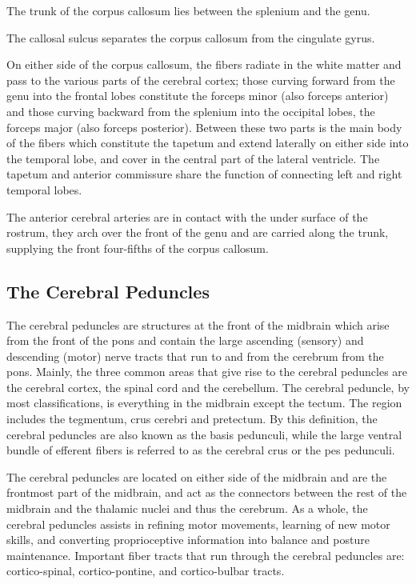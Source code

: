 The trunk of the corpus callosum lies between the splenium and the genu.

The callosal sulcus separates the corpus callosum from the cingulate gyrus.

On either side of the corpus callosum, the fibers radiate in the white matter and pass to the various parts of the cerebral cortex; those curving forward from the genu into the frontal lobes constitute the forceps minor (also forceps anterior) and those curving backward from the splenium into the occipital lobes, the forceps major (also forceps posterior). Between these two parts is the main body of the fibers which constitute the tapetum and extend laterally on either side into the temporal lobe, and cover in the central part of the lateral ventricle. The tapetum and anterior commissure share the function of connecting left and right temporal lobes.

The anterior cerebral arteries are in contact with the under surface of the rostrum, they arch over the front of the genu and are carried along the trunk, supplying the front four-fifths of the corpus callosum.

\hypertarget{the-cerebral-peduncles}{%
\subsection{The Cerebral Peduncles}\label{the-cerebral-peduncles}}

The cerebral peduncles are structures at the front of the midbrain which arise from the front of the pons and contain the large ascending (sensory) and descending (motor) nerve tracts that run to and from the cerebrum from the pons. Mainly, the three common areas that give rise to the cerebral peduncles are the cerebral cortex, the spinal cord and the cerebellum. The cerebral peduncle, by most classifications, is everything in the midbrain except the tectum. The region includes the tegmentum, crus cerebri and pretectum. By this definition, the cerebral peduncles are also known as the basis pedunculi, while the large ventral bundle of efferent fibers is referred to as the cerebral crus or the pes pedunculi.

The cerebral peduncles are located on either side of the midbrain and are the frontmost part of the midbrain, and act as the connectors between the rest of the midbrain and the thalamic nuclei and thus the cerebrum. As a whole, the cerebral peduncles assists in refining motor movements, learning of new motor skills, and converting proprioceptive information into balance and posture maintenance. Important fiber tracts that run through the cerebral peduncles are: cortico-spinal, cortico-pontine, and cortico-bulbar tracts.

